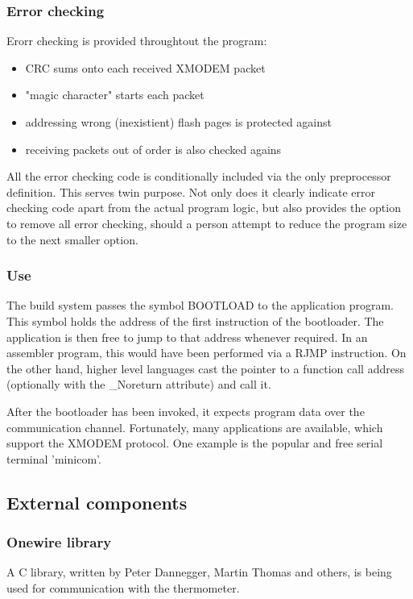 \subsubsection{Error checking}
Erorr checking is provided throughtout the program:
\begin{itemize}
\item{CRC sums onto each received XMODEM packet}
\item{"magic character" starts each packet}
\item{addressing wrong (inexistient) flash pages is protected against}
\item{receiving packets out of order is also checked agains}
\end{itemize}
All the error checking code is conditionally included via the only preprocessor definition.
This serves twin purpose.
Not only does it clearly indicate error checking code apart from the actual program logic, but also provides the option to remove all error checking, should a person attempt to reduce the program size to the next smaller option.

\subsubsection{Use}
The build system passes the symbol BOOTLOAD to the application program.
This symbol holds the address of the first instruction of the bootloader.
The application is then free to jump to that address whenever required.
In an assembler program, this would have been performed via a RJMP instruction.
On the other hand, higher level languages cast the pointer to a function call address (optionally with the \_Noreturn attribute) and call it.
\par
After the bootloader has been invoked, it expects program data over the communication channel.
Fortunately, many applications are available, which support the XMODEM protocol.
One example is the popular and free serial terminal 'minicom'.

\subsection{External components}
\subsubsection{Onewire library}
A C library, written by Peter Dannegger, Martin Thomas and others, is being used for communication with the thermometer.

